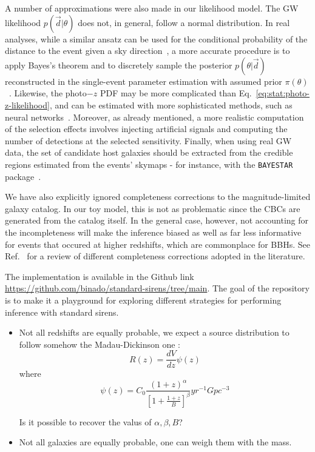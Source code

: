 \documentclass[%
preprint,
nofootinbib,
 amsmath,amssymb,
 aps,
]{revtex4-2}
\newcommand{\given}[2]{p( #1 | #2 )}
\newcommand{\rs}[1]{{\color{green}{#1}}}
\newcommand{\be}{\begin{equation}}
\newcommand{\ee}{\end{equation}}
\newcommand{\paq}[1]{\left[#1\right]}
\begin{document}
A number of approximations were also made in our likelihood model. The GW likelihood
$\given{\vec{d}}{\theta}$ does not, in general, follow a normal distribution. In real analyses,
while a similar ansatz can be used for the conditional probability of the distance to the event
given a sky direction~\cite{Singer_2016}, a more accurate procedure is to apply Bayes's theorem and
to discretely sample the posterior $\given{\theta}{\vec{d}}$ reconstructed in the single-event
parameter estimation with assumed prior $\pi (\theta)$~\cite{Mandel:2018mve}. Likewise, the
photo$-z$ PDF may be more complicated than Eq.~\eqref{eq:stat:photo-z-likelihood}, and can be
estimated with more sophisticated methods, such as neural
networks~\cite{Palmese_2023,alfradique2023dark}. Moreover, as already mentioned, a more realistic
computation of the selection effects involves injecting artificial signals and computing the number
of detections at the selected sensitivity. Finally, when using real GW data, the set of candidate
host galaxies should be extracted from the credible regions estimated from the events' skymaps -
for instance, with the \texttt{BAYESTAR} package~\cite{PhysRevD.93.024013}.

We have also explicitly ignored completeness corrections to the magnitude-limited galaxy catalog.
In our toy model, this is not as problematic since the CBCs are generated from the catalog itself.
In the general case, however, not accounting for the incompleteness will make the inference biased
as well as far less informative for events that occured at higher redshifts, which are commonplace
for BBHs. See Ref.~ for a review of different completeness
corrections adopted in the literature.

The implementation is available in the Github link
\url{https://github.com/binado/standard-sirens/tree/main}. The goal of the repository is to make it
a playground for exploring different strategies for performing inference with standard sirens.

\rs{\subsection{Suggestions for development}}

\begin{itemize}
	\item Not all redshifts are equally probable, we expect a source distribution to follow somehow the
	      Madau-Dickinson one \cite{Madau:2014bja}: \be R(z)=\frac{dV}{dz}\psi(z) \ee where \be
	      \psi(z)=C_0\frac{(1+z)^\alpha}{\paq{1+\frac{1+z}B}^{\beta}}yr^{-1}Gpc^{-3} \ee

	      Is it possible to recover the valus of $\alpha,\beta, B$?

	\item Not all galaxies are equally probable, one can weigh them with the mass.

\end{itemize}
\end{document}
